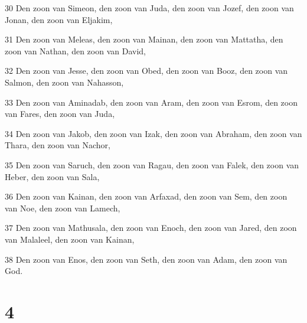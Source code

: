 \par 30 Den zoon van Simeon, den zoon van Juda, den zoon van Jozef, den zoon van Jonan, den zoon van Eljakim,
\par 31 Den zoon van Meleas, den zoon van Mainan, den zoon van Mattatha, den zoon van Nathan, den zoon van David,
\par 32 Den zoon van Jesse, den zoon van Obed, den zoon van Booz, den zoon van Salmon, den zoon van Nahasson,
\par 33 Den zoon van Aminadab, den zoon van Aram, den zoon van Esrom, den zoon van Fares, den zoon van Juda,
\par 34 Den zoon van Jakob, den zoon van Izak, den zoon van Abraham, den zoon van Thara, den zoon van Nachor,
\par 35 Den zoon van Saruch, den zoon van Ragau, den zoon van Falek, den zoon van Heber, den zoon van Sala,
\par 36 Den zoon van Kainan, den zoon van Arfaxad, den zoon van Sem, den zoon van Noe, den zoon van Lamech,
\par 37 Den zoon van Mathusala, den zoon van Enoch, den zoon van Jared, den zoon van Malaleel, den zoon van Kainan,
\par 38 Den zoon van Enos, den zoon van Seth, den zoon van Adam, den zoon van God.

\chapter{4}

